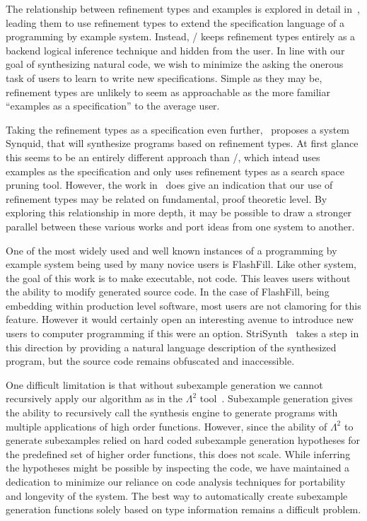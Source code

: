 The relationship between refinement types and examples is explored in detail in~\cite{Osera:2016}, leading them to use refinement types to extend the specification language of a programming by example system. Instead, \ourTool/ keeps refinement types entirely as a backend logical inference technique and hidden from the user. In line with our goal of synthesizing natural code, we wish to minimize the asking the onerous task of users to learn to write new specifications. Simple as they may be, refinement types are unlikely to seem as approachable as the more familiar ``examples as a specification'' to the average user.

Taking the refinement types as a specification even further,~\cite{dblp1683325} proposes a system Synquid, that will synthesize programs based on refinement types. At first glance this seems to be an entirely different approach than \ourTool/, which intead uses examples as the specification and only uses refinement types as a search space pruning tool. However, the work in~\cite{Osera:2016} does give an indication that our use of refinement types may be related on fundamental, proof theoretic level. By exploring this relationship in more depth, it may be possible to draw a stronger parallel between these various works and port ideas from one system to another.

One of the most widely used and well known instances of a programming by example system being used by many novice users is FlashFill\cite{GulwaniHS12}. Like other system, the goal of this work is to make executable, not code. This leaves users without the ability to modify generated source code. In the case of FlashFill, being embedding within production level software, most users are not clamoring for this feature. However it would certainly open an interesting avenue to introduce new users to computer programming if this were an option. StriSynth~\cite{icse} takes a step in this direction by providing a natural language description of the synthesized program, but the source code remains obfuscated and inaccessible.

One difficult limitation is that without subexample generation we cannot recursively apply our algorithm as in the $\Lambda^2$ tool~\cite{Feser:2015}.
Subexample generation gives the ability to recursively call the synthesis engine to generate programs with multiple applications of high order functions.
However, since the ability of $\Lambda^2$ to generate subexamples relied on hard coded subexample generation hypotheses for the predefined set of higher order functions, this does not scale.
While inferring the hypotheses might be possible by inspecting the code, we have maintained a dedication to minimize our reliance on code analysis techniques for portability and longevity of the system.
The best way to automatically create subexample generation functions solely based on type information remains a difficult problem.
